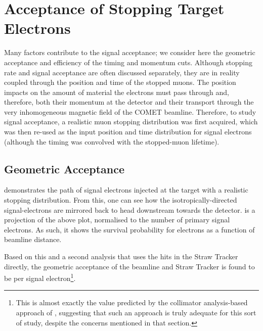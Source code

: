 \section{Acceptance of Stopping Target Electrons}
\FigSensGeomAccept
Many factors contribute to the signal acceptance; we consider here the geometric acceptance and efficiency of the timing and momentum cuts.
Although stopping rate and signal acceptance are often discussed separately, they are in reality coupled through the position and time of the stopped muons.
The position impacts on the amount of material the electrons must pass through and, therefore, both their momentum at the detector and their transport through the very inhomogeneous magnetic field of the COMET beamline.
Therefore, to study signal acceptance, a realistic muon stopping distribution was first acquired, which was then re-used as the input position and time distribution for signal electrons (although the timing was convolved with the stopped-muon lifetime).

\subsection{Geometric Acceptance}
 demonstrates the path of signal electrons injected at the target with a realistic stopping distribution.
From this, one can see how the isotropically-directed signal-electrons are mirrored back to head downstream towards the detector.
 is a projection of the above plot, normalised to the number of primary signal electrons.
As such, it shows the survival probability for electrons as a function of beamline distance.

Based on this and a second analysis that uses the hits in the Straw Tracker directly, the geometric acceptance of the beamline and Straw Tracker is found to be \VarAcceptanceGeom per signal electron\footnote{
This is almost exactly the value predicted by the collimator analysis-based approach of , suggesting that such an approach is truly adequate for this sort of study, despite the concerns mentioned in that section.}.

